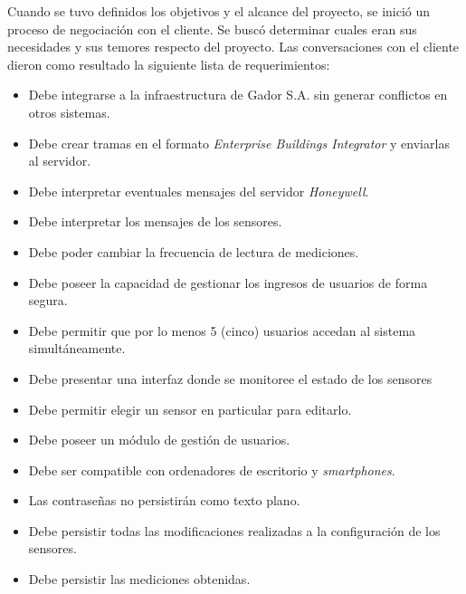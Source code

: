 Cuando se tuvo definidos los objetivos y el alcance del proyecto, se inició un proceso de negociación con el cliente.
Se buscó determinar cuales eran sus necesidades y sus temores respecto del proyecto.
Las conversaciones con el cliente dieron como resultado la siguiente lista de requerimientos:

\begin{itemize}
	\item Debe integrarse a la infraestructura de Gador S.A. sin generar conflictos en otros sistemas.
	\item Debe crear tramas en el formato \emph{Enterprise Buildings Integrator} y enviarlas al servidor.
	\item Debe interpretar eventuales mensajes del servidor \emph{Honeywell}.
	\item Debe interpretar los mensajes de los sensores.
	\item Debe poder cambiar la frecuencia de lectura de mediciones.
	\item Debe poseer la capacidad de gestionar los ingresos de usuarios de forma segura.
	\item Debe permitir que por lo menos 5 (cinco) usuarios accedan al sistema simultáneamente.
	\item Debe presentar una interfaz donde se monitoree el estado de los sensores
	\item Debe permitir elegir un sensor en particular para editarlo.
	\item Debe poseer un módulo de gestión de usuarios.
	\item Debe ser compatible con ordenadores de escritorio y \emph{smartphones}.
	\item Las contraseñas no persistirán como texto plano.
	\item Debe persistir todas las modificaciones realizadas a la configuración de los sensores.
	\item Debe persistir las mediciones obtenidas.
\end{itemize}